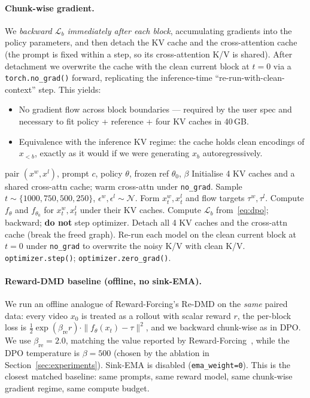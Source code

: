 \documentclass{article}
\begin{document}
\paragraph{Chunk-wise gradient.} We \emph{backward $\mathcal{L}_b$ immediately after each block}, accumulating gradients into the policy parameters, and then detach the KV cache and the cross-attention cache (the prompt is fixed within a step, so its cross-attention K/V is shared). After detachment we overwrite the cache with the clean current block at $t=0$ via a \texttt{torch.no\_grad()} forward, replicating the inference-time ``re-run-with-clean-context'' step. This yields:
\begin{itemize}
\item No gradient flow across block boundaries --- required by the user spec and necessary to fit policy + reference + four KV caches in 40\,GB.
\item Equivalence with the inference KV regime: the cache holds clean encodings of $x_{<b}$, exactly as it would if we were generating $x_b$ autoregressively.
\end{itemize}

\begin{algorithm}
\caption{Chunk-wise Teacher-Forcing DPO}
\label{alg:dpo}
\begin{algorithmic}[1]
\Require pair $(x^{w}, x^{l})$, prompt $c$, policy $\theta$, frozen ref $\theta_0$, $\beta$
\State Initialise 4 KV caches and a shared cross-attn cache; warm cross-attn under \texttt{no\_grad}.
  \State Sample $t \sim \{1000,750,500,250\}$, $\epsilon^{w}, \epsilon^{l} \sim \mathcal{N}$.
  \State Form $x^{w}_t, x^{l}_t$ and flow targets $\tau^w, \tau^l$.
  \State Compute $f_\theta$ and $f_{\theta_0}$ for $x^{w}_t, x^{l}_t$ under their KV caches.
  \State Compute $\mathcal{L}_b$ from~\eqref{eq:dpo}; backward; \textbf{do not} step optimizer.
  \State Detach all 4 KV caches and the cross-attn cache (break the freed graph).
  \State Re-run each model on the clean current block at $t=0$ under \texttt{no\_grad} to overwrite the noisy K/V with clean K/V.
\EndFor
\State \texttt{optimizer.step()}; \texttt{optimizer.zero\_grad()}.
\end{algorithmic}
\end{algorithm}

\paragraph{Reward-DMD baseline (offline, no sink-EMA).} We run an offline analogue of Reward-Forcing's Re-DMD on the \emph{same} paired data: every video $x_0$ is treated as a rollout with scalar reward $r$, the per-block loss is $\tfrac{1}{2} \exp(\beta_{\text{re}} r) \cdot \|f_\theta(x_t) - \tau\|^2$, and we backward chunk-wise as in DPO. We use $\beta_{\text{re}}=2.0$, matching the value reported by Reward-Forcing~\cite{lu2025rewardforcing}, while the DPO temperature is $\beta=500$ (chosen by the ablation in Section~\ref{sec:experiments}). Sink-EMA is disabled (\texttt{ema\_weight=0}). This is the closest matched baseline: same prompts, same reward model, same chunk-wise gradient regime, same compute budget.
\end{document}
